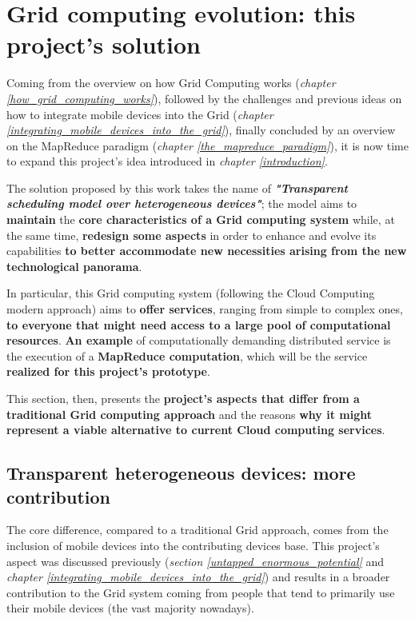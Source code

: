 \section{Grid computing evolution: this project's solution}
Coming from the overview on how Grid Computing works (\textit{chapter \ref{how_grid_computing_works}}), followed by the challenges and previous ideas on how to integrate mobile devices into the Grid (\textit{chapter \ref{integrating_mobile_devices_into_the_grid}}), finally concluded by an overview on the MapReduce paradigm (\textit{chapter \ref{the_mapreduce_paradigm}}), it is now time to expand this project's idea introduced in \textit{chapter \ref{introduction}}.

The solution proposed by this work takes the name of \textbf{\textit{"Transparent scheduling model over heterogeneous devices"}}; the model aims to \textbf{maintain} the \textbf{core characteristics of a Grid computing system} while, at the same time, \textbf{redesign some aspects} in order to enhance and evolve its capabilities \textbf{to better accommodate new necessities arising from the new technological panorama}.

In particular, this Grid computing system (following the Cloud Computing modern approach) aims to \textbf{offer services}, ranging from simple to complex ones, \textbf{to everyone that might need access to a large pool of computational resources}. \textbf{An example} of computationally demanding distributed service is the execution of a \textbf{MapReduce computation}, which will be the service \textbf{realized for this project's prototype}.

This section, then, presents the \textbf{project's aspects that differ from a traditional Grid computing approach} and the reasons \textbf{why it might represent a viable alternative to current Cloud computing services}.

\subsection{Transparent heterogeneous devices: more contribution}\label{transparent_heterogeneous_devices_more_contribution}
The core difference, compared to a traditional Grid approach, comes from the inclusion of mobile devices into the contributing devices base.
This project's aspect was discussed previously (\textit{section \ref{untapped_enormous_potential}} and \textit{chapter \ref{integrating_mobile_devices_into_the_grid}}) and results in a broader contribution to the Grid system coming from people that tend to primarily use their mobile devices (the vast majority nowadays).


